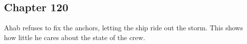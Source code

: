 \subsection{Chapter 120}

Ahab refuses to fix the anchors, letting the ship ride out the storm. This shows how little he cares about the state of the crew.
